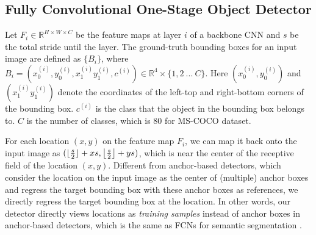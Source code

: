 \documentclass[10pt,twocolumn,letterpaper]{article}
\def\R{{\mathbb R}}
\DeclarePairedDelimiter{\floor}{\lfloor}{\rfloor}
\newcommand{\1}{{\mathbbm{1}}}           %
\begin{document}
\subsection{Fully Convolutional One-Stage Object Detector%
}
Let $F_i \in \R^{H \times W \times C}$ be the feature maps at layer $i$ of a backbone CNN and $s$ be the total stride until the layer. The ground-truth bounding boxes for an input image are defined as $\{B_i\}$, where $B_i = (x^{(i)}_0, y^{(i)}_0, x^{(i)}_1 y^{(i)}_1, c^{(i)}) \in \R^4 \times \{1, 2\ ...\ C\}$. 
Here 
$(x^{(i)}_0, y^{(i)}_0)$ and $(x^{(i)}_1 y^{(i)}_1)$ %
denote the coordinates of the left-top 
%
%
and right-bottom corners of the bounding box.
%
$c^{(i)}$ is 
the class that the object in the bounding box belongs to. %
$C$ is the number of classes, which is $80$ for MS-COCO dataset.


For each location $(x, y)$ on the feature map $F_i$, we can map it back onto the input image as $(\floor{\frac{s}{2}} + xs, \floor*{\frac{s}{2}} + ys)$, which is near the center of the receptive field of the location $(x, y)$. Different from anchor-based detectors, which consider the location on the input image as the center of (multiple) anchor boxes and 
%
%
regress the target bounding box with these anchor boxes as references, we directly %
regress the target bounding box at the location. In other words, our detector directly views locations as \emph{training samples} instead of anchor boxes in anchor-based detectors, which is the same as FCNs for semantic segmentation \cite{long2015fully}.
%
%
%
%
\end{document}
